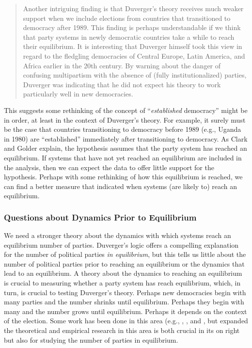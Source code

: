 \documentclass[12pt]{article}
\begin{document}
\begin{quote}
Another intriguing finding is that Duverger's theory receives much weaker support when we include elections from countries that transitioned to democracy after 1989. 
This finding is perhaps understandable if we think that party systems in newly democratic countries take a while to reach their equilibrium. 
It is interesting that Duverger himself took this view in regard to the fledgling democracies of Central Europe, Latin America, and Africa earlier in the 20th century. 
By warning about the danger of confusing multipartism with the absence of (fully institutionalized) parties, Duverger was indicating that he did not expect his theory to work particularly well in new democracies. 
\end{quote}

This suggests some rethinking of the concept of ``\textit{established} democracy'' might be in order, at least in the context of Duverger's theory. 
For example, it surely must be the case that countries transitioning to democracy before 1989 (e.g., Uganda in 1980) are ``established'' immediately after transitioning to democracy. 
As Clark and Golder explain, the hypothesis assumes that the party system has reached an equilibrium. If systems that have not yet reached an equilibrium are included in the analysis, then we can expect the data to offer little support for the hypothesis. 
Perhaps with some rethinking of how this equilibrium is reached, we can find a better measure that indicated when systems (are likely to) reach an equilibrium.


\subsubsection*{Questions about Dynamics Prior to Equilibrium}

We need a stronger theory about the dynamics with which systems reach an equilibrium number of parties. Duverger's logic offers a compelling explanation for the number of political parties \textit{in equilibrium}, but this tells us little about the number of political parties prior to reaching an equilibrium or the dynamics that lead to an equilibrium. 
A theory about the dynamics to reaching an equilibrium is crucial to measuring whether a party system has reach equilibrium, which, in turn, is crucial to testing Duverger's theory. 
Perhaps new democracies begin with many parties and the number shrinks until equilibrium. 
Perhaps they begin with many and the number grows until equilibrium. 
Perhaps it depends on the context of the election. 
Some work has been done in this area (e.g.,  \citealt{Moser1999}, \citealt{CrispOlivelloPotter2012}, and \citealt{Ferrara2011}, but expanded the theoretical and empirical research in this area is both crucial in its on right but also for studying the number of parties in equilibrium. 
\end{document}
